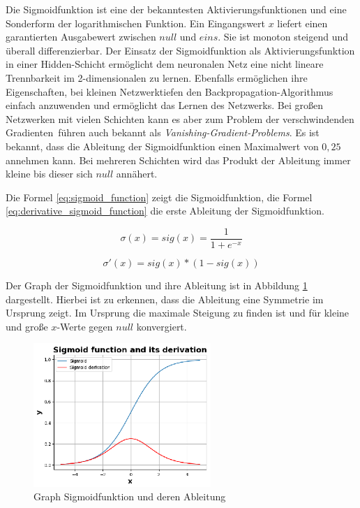 Die Sigmoidfunktion ist eine der bekanntesten Aktivierungsfunktionen und eine Sonderform der logarithmischen Funktion. Ein Eingangswert $x$ liefert einen garantierten Ausgabewert zwischen $null$ und $eins$. Sie ist monoton steigend und überall differenzierbar. Der Einsatz der Sigmoidfunktion als Aktivierungsfunktion in einer Hidden-Schicht ermöglicht dem neuronalen Netz eine nicht lineare Trennbarkeit im 2-dimensionalen zu lernen. Ebenfalls ermöglichen ihre Eigenschaften, bei kleinen Netzwerktiefen den Backpropagation-Algorithmus einfach anzuwenden und ermöglicht das Lernen des Netzwerks. Bei großen Netzwerken mit vielen Schichten kann es aber zum \glqq Problem der verschwindenden Gradienten\grqq \ führen auch bekannt als \textit{Vanishing-Gradient-Problems}. Es ist bekannt, dass die Ableitung der Sigmoidfunktion einen Maximalwert von $0,25$ annehmen kann. Bei mehreren Schichten wird das Produkt der Ableitung immer kleine bis dieser sich $null$ annähert.\vspace{0.2cm}

Die Formel \ref{eq:sigmoid_function} zeigt die Sigmoidfunktion, die Formel \ref{eq:derivative_sigmoid_function} die erste Ableitung der Sigmoidfunktion.

\begin{equation}\label{eq:sigmoid_function}
	\sigma (x) = sig(x) = \frac{1}{1 + e^{-x}}
\end{equation}

\begin{equation}\label{eq:derivative_sigmoid_function}
	\sigma' (x) = sig(x) * (1 - sig(x))
\end{equation}

Der Graph der Sigmoidfunktion und ihre Ableitung ist in Abbildung \ref{img:sig_func_graph} dargestellt. Hierbei ist zu erkennen, dass die Ableitung eine Symmetrie im Ursprung zeigt. Im Ursprung die maximale Steigung zu finden ist und für kleine und große $x$-Werte gegen $null$ konvergiert.

\begin{figure}[!ht]
	\includegraphics[width=0.6\textwidth]{content/chapter_basics/plots/sigmoid_func_plot.eps}
	\centering
	\caption{Graph Sigmoidfunktion und deren Ableitung}
	\label{img:sig_func_graph}
\end{figure}

